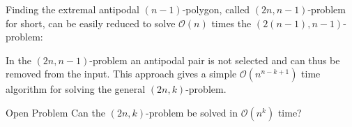 \documentclass{beamer}
\begin{document}
\begin{frame}
Finding the extremal antipodal $(n-1)$-polygon, called $(2n, n-1)$-problem for short, can be easily
reduced to solve $\mathcal{O}(n)$ times the $(2(n - 1), n - 1)$-problem: \pause
\vspace{0.5cm}

In the $(2n, n - 1)$-problem an antipodal pair is not selected and can thus be removed
from the input. This approach gives a simple $\mathcal{O}(n^{n-k+1})$ time algorithm for solving
the general $(2n, k)$-problem.\pause
\vspace{0.5cm}

\begin{alertblock}{Open Problem}
Can the $(2n,k)$-problem be solved in $\mathcal{O}(n^k)$ time?
\end{alertblock}

\end{frame}

\begin{frame}
\begin{figure}
\end{figure}
\end{frame}
\end{document}
